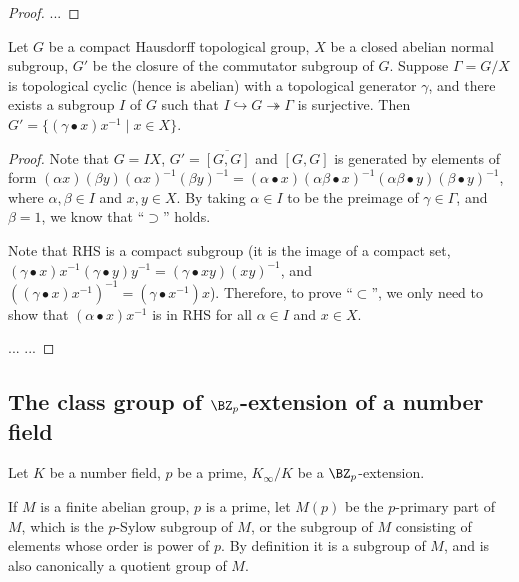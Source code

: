 \begin{proof}
...
\end{proof}

\begin{lem}
\label{commutator-eq}
Let $G$ be a compact Hausdorff
topological group, $X$ be a closed abelian normal subgroup,
$G'$ be the closure of the commutator subgroup of $G$.
Suppose $\Gamma=G/X$ is topological cyclic (hence is abelian)
with a topological generator $\gamma$,
and there exists a subgroup $I$ of $G$
such that $I\hookrightarrow G\twoheadrightarrow\Gamma$ is surjective.
Then $G'=\{(\gamma\bullet x)x^{-1}\mid x\in X\}$.
\end{lem}

\begin{proof}
Note that $G=IX$, $G'=\overline{[G,G]}$
and $[G,G]$ is generated by elements of form
$(\alpha x)(\beta y)(\alpha x)^{-1}(\beta y)^{-1}
=(\alpha\bullet x)(\alpha\beta\bullet x)^{-1}(\alpha\beta\bullet y)(\beta\bullet y)^{-1}$,
where $\alpha,\beta\in I$ and $x,y\in X$.
By taking $\alpha\in I$ to be the preimage of $\gamma\in\Gamma$, and $\beta=1$,
we know that ``$\supset$'' holds.

Note that RHS is a compact subgroup
(it is the image of a compact set,
$(\gamma\bullet x)x^{-1}(\gamma\bullet y)y^{-1}
=(\gamma\bullet xy)(xy)^{-1}$,
and $((\gamma\bullet x)x^{-1})^{-1}
=(\gamma\bullet x^{-1})x$).
Therefore, to prove ``$\subset$'', we only need to show that
$(\alpha\bullet x)x^{-1}$ is in RHS for all $\alpha\in I$ and $x\in X$.

... ...
\end{proof}

\subsection{The class group of $\BZ_p$-extension of a number field}

Let $K$ be a number field, $p$ be a prime,
$K_\infty/K$ be a $\BZ_p$-extension.

\begin{definition}
\label{p-primary-part}
\leanok
If $M$ is a finite abelian group, $p$ is a prime, let $M(p)$ be the $p$-primary
part of $M$, which is the $p$-Sylow subgroup of $M$, or the subgroup of $M$
consisting of elements whose order is power of $p$.
By definition it is a subgroup of $M$, and is also canonically a quotient group of $M$.
\end{definition}

